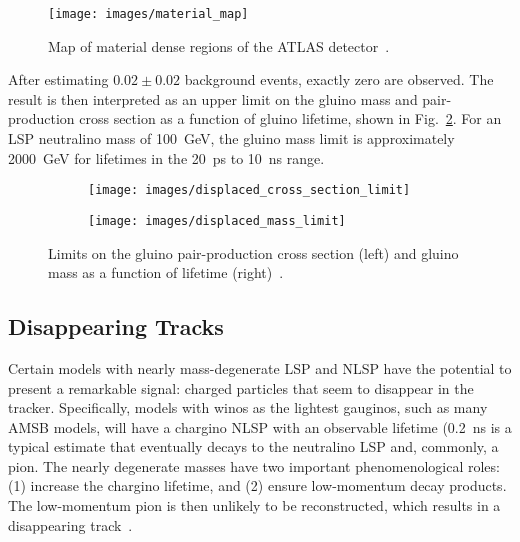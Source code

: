 \documentclass[12pt]{article}
\begin{document}
        \noindent \begin{figure}[htbp] \begin{center}
        \texttt{[image: images/material\_map]}
        \caption{Map of material dense regions of the ATLAS detector~\cite{atlas_displaced}.}
        \label{material_map}
        \end{center} \end{figure}

        After estimating $\num{0.02} \pm \num{0.02}$ background events, exactly zero are observed. The result is then interpreted as an upper limit on the gluino mass and pair-production cross section as a function of gluino lifetime, shown in Fig.~\ref{displaced_limit}. For an LSP neutralino mass of \SI{100}{\giga\electronvolt}, the gluino mass limit is approximately \SI{2000}{\giga\electronvolt} for lifetimes in the \SI{20}{\pico\s} to \SI{10}{\nano\s} range.

        \noindent \begin{figure}[htbp] \begin{center}
        \begin{subfigure}[htbp]{0.45\textwidth} \begin{center}
        \texttt{[image: images/displaced\_cross\_section\_limit]}
        \end{center} \end{subfigure}
        \begin{subfigure}[htbp]{0.45\textwidth} \begin{center}
        \texttt{[image: images/displaced\_mass\_limit]}
        \end{center} \end{subfigure}
        \caption{Limits on the gluino pair-production cross section (left) and gluino mass as a function of lifetime (right)~\cite{atlas_displaced}.}
        \label{displaced_limit}
        \end{center} \end{figure}

    \subsection{Disappearing Tracks}
        Certain models with nearly mass-degenerate LSP and NLSP have the potential to present a remarkable signal: charged particles that seem to disappear in the tracker. Specifically, models with winos as the lightest gauginos, such as many AMSB models, will have a chargino NLSP with an observable lifetime (\SI{0.2}{\nano\s} is a typical estimate that eventually decays to the neutralino LSP and, commonly, a pion. The nearly degenerate masses have two important phenomenological roles: (1) increase the chargino lifetime, and (2) ensure low-momentum decay products. The low-momentum pion is then unlikely to be reconstructed, which results in a disappearing track~\cite{atlas_disappearing}.
\end{document}
